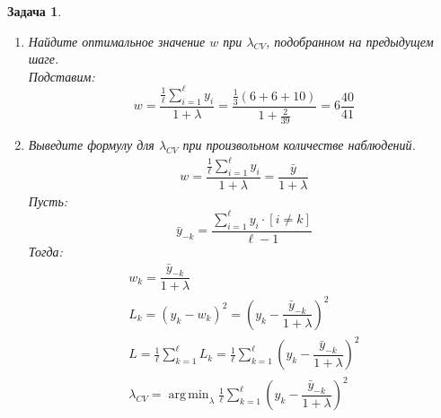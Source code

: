 \documentclass[a4paper,12pt]{article}
\DeclareMathOperator*{\argmin}{arg\,min}
\theoremstyle{mystyle}
\newtheorem{esProblem}{Задача}
\begin{document}
\begin{esProblem}
\begin{enumerate}
\begin{itemize}
    3.  $y_1 = 6$, $y_2 = 6$, тогда $w_{opt} = \frac{6}{1 + \lambda}$
    \item Посчитаем ошибки, допущенные на тесте: \\
    \[
    Loss = \left(\dfrac{8}{1 + \lambda} - 6\right)^2 + \left(\dfrac{8}{1 + \lambda} - 6\right)^2 + \left(\dfrac{6}{1 + \lambda} - 12\right)^2    
    \]
    Искомая $\lambda_{opt}$:
    \[
    \lambda_{opt} = \argmin_{\lambda} Loss
\]
    Решая уравнение 
    \[
     \frac{\partial Loss}{\partial \lambda} = 0
    \]
    Получаем численный ответ:
    \[
    \lambda_{CV} = \frac{2}{39}
    \]
    \end{itemize}
	\item Найдите оптимальное значение $w$ при $\lambda_{CV}$, подобранном на предыдущем шаге. \\
	Подставим:
	\[
	w = \dfrac{\frac{1}{\ell} \sum_{i=1}^{\ell} y_i}{1 + \lambda}= \dfrac{\frac{1}{3}(6 + 6 + 10)}{1 + \frac{2}{39}} = 6\frac{40}{41}
	\]
    \item Выведите формулу для $\lambda_{CV}$ при произвольном количестве наблюдений.
    \[
\begin{gathered}
	w = \dfrac{\frac{1}{\ell} \sum_{i=1}^{\ell} y_i}{1 + \lambda} = \dfrac{\bar{y}}{1 + \lambda}\end{gathered}
\]
Пусть:
\[
\bar{y}_{-k} = \dfrac{\sum_{i=1}^{\ell} y_i \cdot [i \neq k]}{\ell - 1}
\]
Тогда:
\[
\begin{gathered}
w_{k} = \dfrac{\bar{y}_{-k}}{1 + \lambda} \\
L_{k} = (y_k - w_{k})^2 = \left( y_k - \dfrac{\bar{y}_{-k}}{1 + \lambda} \right)^2 \\
L = \frac{1}{\ell}\sum_{k=1}^{\ell} L_{k} =  \frac{1}{\ell}\sum_{k=1}^{\ell} \left( y_k - \dfrac{\bar{y}_{-k}}{1 + \lambda} \right)^2 \\
\lambda_{CV} = \argmin_{\lambda} \frac{1}{\ell}\sum_{k=1}^{\ell} \left( y_k - \dfrac{\bar{y}_{-k}}{1 + \lambda} \right)^2 
\end{gathered}
\]
\end{enumerate}
\end{esProblem}
\end{document}
